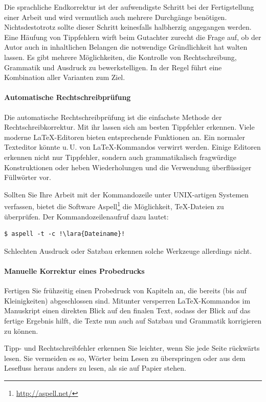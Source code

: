 Die sprachliche Endkorrektur ist der aufwendigste Schritt bei der
Fertigstellung einer Arbeit und wird vermutlich auch mehrere Durchgänge
benötigen. Nichtsdestotrotz sollte dieser Schritt keinesfalls halbherzig
angegangen werden. Eine Häufung von Tippfehlern wirft beim Gutachter zurecht
die Frage auf, ob der Autor auch in inhaltlichen Belangen die notwendige
Gründlichkeit hat walten lassen. Es gibt mehrere Möglichkeiten, die Kontrolle
von Rechtschreibung, Grammatik und Ausdruck zu bewerkstelligen. In der Regel
führt eine Kombination aller Varianten zum Ziel.


\paragraph{Automatische Rechtschreibprüfung}

Die automatische Rechtschreibprüfung ist die einfachste Methode der
Rechtschreibkorrektur. Mit ihr lassen sich am besten Tippfehler erkennen.
Viele moderne \LaTeX-Editoren bieten entsprechende Funktionen an. Ein normaler
Texteditor könnte u.\,U. von \LaTeX-Kommandos verwirrt werden. Einige Editoren
erkennen nicht nur Tippfehler, sondern auch grammatikalisch fragwürdige
Konstruktionen oder heben Wiederholungen und die Verwendung überflüssiger
Füllwörter vor.

Sollten Sie Ihre Arbeit mit der Kommandozeile unter UNIX-artigen Systemen
verfassen, bietet die Software Aspell\footnote{\url{http://aspell.net/}} die
Möglichkeit, \TeX-Dateien zu überprüfen. Der Kommandozeilenaufruf dazu lautet:

\begin{lstlisting}[escapechar=\!]
$ aspell -t -c !\lara{Dateiname}!
\end{lstlisting}

Schlechten Ausdruck oder Satzbau erkennen solche Werkzeuge allerdings nicht.


\paragraph{Manuelle Korrektur eines Probedrucks}

Fertigen Sie frühzeitig einen Probedruck von Kapiteln an, die bereits (bis auf
Kleinigkeiten) abgeschlossen sind. Mitunter versperren \LaTeX-Kommandos im
Manuskript einen direkten Blick auf den finalen Text, sodass der Blick auf das
fertige Ergebnis hilft, die Texte nun auch auf Satzbau und Grammatik
korrigieren zu können.

Tipp- und Rechtschreibfehler erkennen Sie leichter, wenn Sie jede Seite
rückwärts lesen. Sie vermeiden es so, Wörter beim Lesen zu überspringen oder
aus dem Lesefluss heraus anders zu lesen, als sie auf Papier stehen.

